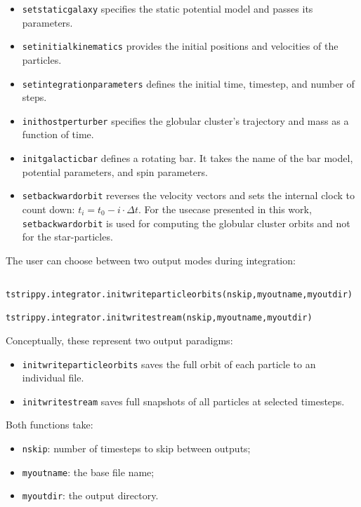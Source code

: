 \documentclass{article}
\begin{document}
        \begin{itemize}
            \item \texttt{setstaticgalaxy} specifies the static potential model and passes its parameters.
            \item \texttt{setinitialkinematics} provides the initial positions and velocities of the particles.
            \item \texttt{setintegrationparameters} defines the initial time, timestep, and number of steps.
            \item \texttt{inithostperturber} specifies the globular cluster’s trajectory and mass as a function of time.
            \item \texttt{initgalacticbar} defines a rotating bar. It takes the name of the bar model, potential parameters, and spin parameters.
            \item \texttt{setbackwardorbit} reverses the velocity vectors and sets the internal clock to count down: $t_i = t_0 - i \cdot \Delta t$. For the usecase presented in this work, \texttt{setbackwardorbit} is used for computing the globular cluster orbits and not for the star-particles. 
        \end{itemize}

        The user can choose between two output modes during integration:
        \begin{lstlisting}
            tstrippy.integrator.initwriteparticleorbits(nskip,myoutname,myoutdir)
            tstrippy.integrator.initwritestream(nskip,myoutname,myoutdir)
        \end{lstlisting}
        Conceptually, these represent two output paradigms:
        \begin{itemize}
            \item \texttt{initwriteparticleorbits} saves the full orbit of each particle to an individual file.
            \item \texttt{initwritestream} saves full snapshots of all particles at selected timesteps.
        \end{itemize}

        Both functions take:
        \begin{itemize}
            \item \texttt{nskip}: number of timesteps to skip between outputs;
            \item\texttt{myoutname}: the base file name;
            \item \texttt{myoutdir}: the output directory.
        \end{itemize}
\end{document}

